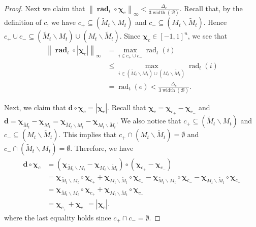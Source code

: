 \documentclass{article}
\newcommand{\B}{\mathcal B}
\newcommand{\del}{\backslash}
\DeclareMathOperator{\rank}{width}
\DeclareMathOperator{\rad}{rad}
\newcommand{\nor}[1]{\left\|#1\right\|}
\renewcommand{\vec}[1]{\boldsymbol{#1}}
\renewcommand{\odot}{\circ}
\begin{document}
\begin{proof}
Next we claim that $\nor{\vec \rad_t \odot \vec \chi_c}_\infty < \frac{\Delta_e}{3\rank(\B)}$.
Recall that, by the definition of $c$, we have
$c_+\subseteq (\tilde M_t \del M_t)$ and $c_-\subseteq (M_t\del \tilde M_t)$. 
Hence $c_+\cup c_- \subseteq  (\tilde M_t \del M_t)\cup (M_t\del \tilde M_t)$.
Since $\vec \chi_c \in [-1,1]^n$, we see that 
\begin{align}
\nor{\vec \rad_t \odot |\vec \chi_c|}_\infty &= \max_{i\in  c_+\cup c_-} \rad_t(i) \nonumber \\
									    &\le \max_{i\in  (\tilde M_t \del M_t)\cup (M_t\del \tilde M_t)} \rad_t(i)  \nonumber \\
									    &= \rad_t(e) < \frac{\Delta_e}{3\rank(\B)} \label{eq:u-c-1-0-1}.
\end{align}


Next, we claim that $\vec d \odot \vec \chi_c = |\vec \chi_c|$.
Recall that $\vec\chi_c = \vec\chi_{c_+}-\vec\chi_{c_-}$
and $\vec d = \vec \chi_{\tilde M_t}-\vec \chi_{M_t} = \vec\chi_{\tilde M_t\del M_t} - \vec\chi_{M_t\del \tilde M_t}$.
We also notice that $c_+ \subseteq (\tilde M_t \del M_t)$ and $c_- \subseteq (M_t \del \tilde M_t)$.
This implies that $c_+ \cap (M_t \del \tilde M_t) = \emptyset$ and $c_-\cap (\tilde M_t \del M_t) = \emptyset$.
Therefore, we have
\begin{align*}
\vec d \odot \vec \chi_c &= (\vec\chi_{\tilde M_t\del M_t} - \vec\chi_{M_t\del \tilde M_t})\odot(\vec\chi_{c_+}-\vec\chi_{c_-})\\
&= \vec\chi_{\tilde M_t\del M_t}\odot \vec\chi_{c_+}+
   \vec\chi_{M_t \del \tilde M_t}\odot \vec\chi_{c_-}-
   \vec\chi_{\tilde M_t\del M_t}\odot \vec\chi_{c_-}-
   \vec\chi_{M_t\del \tilde M_t}\odot \vec\chi_{c_+}\\
&= \vec\chi_{\tilde M_t\del M_t}\odot \vec\chi_{c_+}+
   \vec\chi_{M_t \del \tilde M_t}\odot \vec\chi_{c_-} \\
&= \vec\chi_{c_+}+\vec\chi_{c_-} =|\vec\chi_c|. 
\end{align*}
where the last equality holds since $c_+\cap c_- =\emptyset$.


\end{proof}
\end{document}
